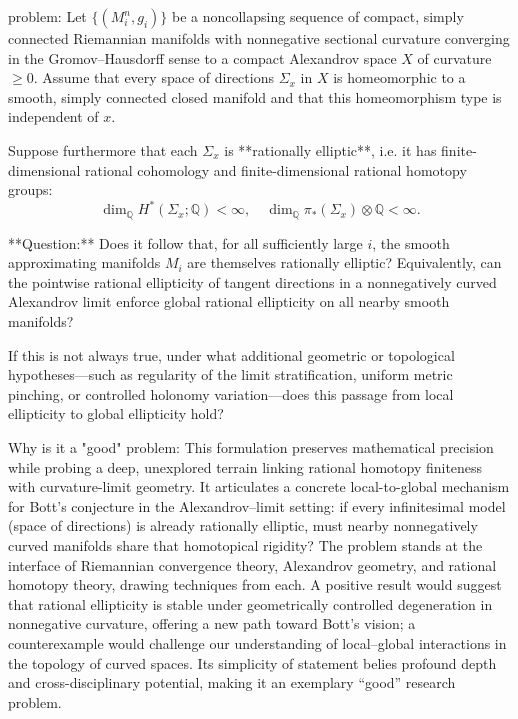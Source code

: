 problem:  
Let \( \{(M_i^n,g_i)\} \) be a noncollapsing sequence of compact, simply connected Riemannian manifolds with nonnegative sectional curvature converging in the Gromov–Hausdorff sense to a compact Alexandrov space \( X \) of curvature \( \ge 0 \).  
Assume that every space of directions \( \Sigma_x \) in \( X \) is homeomorphic to a smooth, simply connected closed manifold and that this homeomorphism type is independent of \( x \).  

Suppose furthermore that each \( \Sigma_x \) is **rationally elliptic**, i.e. it has finite-dimensional rational cohomology and finite-dimensional rational homotopy groups:
\[
\dim_\mathbb Q H^*(\Sigma_x;\mathbb Q) <\infty, \quad
\dim_\mathbb Q \pi_*(\Sigma_x)\otimes \mathbb Q < \infty.
\]
  
**Question:**  
Does it follow that, for all sufficiently large \( i \), the smooth approximating manifolds \( M_i \) are themselves rationally elliptic?  
Equivalently, can the pointwise rational ellipticity of tangent directions in a nonnegatively curved Alexandrov limit enforce global rational ellipticity on all nearby smooth manifolds?  
  
If this is not always true, under what additional geometric or topological hypotheses—such as regularity of the limit stratification, uniform metric pinching, or controlled holonomy variation—does this passage from local ellipticity to global ellipticity hold?  

Why is it a "good" problem:  
This formulation preserves mathematical precision while probing a deep, unexplored terrain linking rational homotopy finiteness with curvature-limit geometry. It articulates a concrete local-to-global mechanism for Bott’s conjecture in the Alexandrov–limit setting: if every infinitesimal model (space of directions) is already rationally elliptic, must nearby nonnegatively curved manifolds share that homotopical rigidity? The problem stands at the interface of Riemannian convergence theory, Alexandrov geometry, and rational homotopy theory, drawing techniques from each. A positive result would suggest that rational ellipticity is stable under geometrically controlled degeneration in nonnegative curvature, offering a new path toward Bott’s vision; a counterexample would challenge our understanding of local–global interactions in the topology of curved spaces. Its simplicity of statement belies profound depth and cross-disciplinary potential, making it an exemplary “good” research problem.